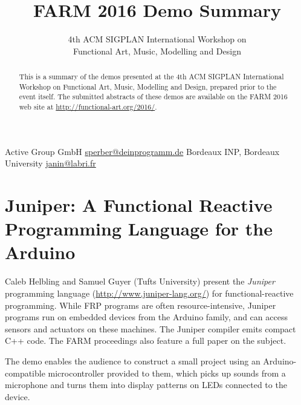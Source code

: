 \documentclass{sigplanconf}
\begin{document}
\toappear

\setlength{\pdfpageheight}{\paperheight}
\setlength{\pdfpagewidth}{\paperwidth}


\title{FARM 2016 Demo Summary}
\subtitle{4th ACM SIGPLAN International Workshop on \\ Functional Art, Music, Modelling and Design}

           {Active Group GmbH}
           {\url{sperber@deinprogramm.de}}
           {Bordeaux INP, Bordeaux University}
           {\url{janin@labri.fr}}

\maketitle

\begin{abstract}
  This is a summary of the demos presented at the 4th ACM SIGPLAN
  International Workshop on Functional Art, Music, Modelling and
  Design, prepared prior to the event itself.  The submitted abstracts
  of these demos are available on the FARM 2016 web site at
  \url{http://functional-art.org/2016/}.
\end{abstract}


\section{Juniper: A Functional Reactive Programming Language for the Arduino}

Caleb Helbling and Samuel Guyer (Tufts University) present the
\textit{Juniper} programming language (\url{http://www.juniper-lang.org/}) for functional-reactive
programming.  While FRP programs are often resource-intensive, Juniper
programs run on embedded devices from the Arduino family, and can
access sensors and actuators on these machines.  The Juniper compiler
emits compact C++ code.  The FARM proceedings also feature a full
paper on the subject.

The demo enables the audience to construct a small project using an
Arduino-compatible microcontroller provided to them, which
picks up sounds from a microphone and turns them into display patterns
on LEDs connected to the device.
\end{document}
